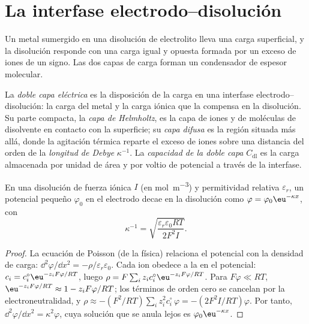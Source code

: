 \section{La interfase electrodo--disolución}

Un metal sumergido en una disolución de electrolito lleva una carga superficial, y la
disolución responde con una carga igual y opuesta formada por un exceso de iones
de un signo. Las dos capas de carga forman un condensador de espesor molecular.

\begin{definition}\label{def:b3:electrode-kinetics:double-layer}
La \emph{doble capa eléctrica} es la
disposición de la carga en una interfase electrodo--disolución: la carga del
metal y la carga iónica que la compensa en la disolución. Su parte compacta, la
\emph{capa de Helmholtz}, es la capa de iones y de moléculas de disolvente
en contacto con la superficie; su \emph{capa difusa}
es la región situada más allá, donde la agitación térmica reparte el exceso de iones sobre
una distancia del orden de la \emph{longitud de Debye} $\kappa^{-1}$. La
\emph{capacidad de la doble capa} $C_{\mathrm{dl}}$ es la carga
almacenada por unidad de área y por voltio de potencial a través de la interfase.
\end{definition}

\begin{proposition}\label{prop:b3:electrode-kinetics:debye-length}
En una disolución de fuerza iónica $I$ (en \unit{mol.m^{-3}}) y permitividad relativa
$\varepsilon_r$, un potencial pequeño $\varphi_0$ en el electrodo decae en la disolución como
$\varphi = \varphi_0\eu^{-\kappa x}$, con
\[
  \kappa^{-1} = \sqrt{\frac{\varepsilon_r\varepsilon_0RT}{2F^2I}} .
\]
\end{proposition}

\begin{proof}
La ecuación de Poisson (de la física) relaciona el potencial con la densidad de carga:
$\dd^2\varphi/\dd x^2 = -\rho/\varepsilon_r\varepsilon_0$. Cada ion obedece a la  en el
potencial: $c_i = c_i^{\circ}\eu^{-z_iF\varphi/RT}$, luego $\rho = F\sum_iz_ic_i^{\circ}\eu^{-z_iF\varphi/RT}$. Para $F\varphi \ll RT$,
$\eu^{-z_iF\varphi/RT} \approx 1 - z_iF\varphi/RT$; los términos de orden cero se cancelan por la electroneutralidad,
y $\rho \approx -(F^2/RT)\sum_iz_i^2c_i^{\circ}\,\varphi = -(2F^2I/RT)\varphi$. Por tanto, $\dd^2\varphi/\dd x^2 = \kappa^2\varphi$, cuya
solución que se anula lejos es $\varphi_0\eu^{-\kappa x}$.
\end{proof}

